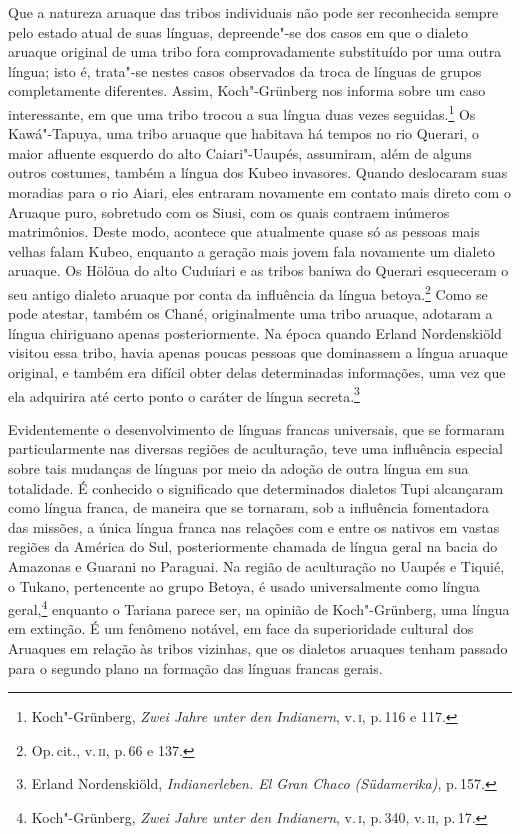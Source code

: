 Que a natureza aruaque das tribos individuais não pode ser reconhecida
sempre pelo estado atual de suas línguas, depreende"-se dos casos em que
o dialeto aruaque original de uma tribo fora comprovadamente substituído
por uma outra língua; isto é, trata"-se nestes casos observados da troca
de línguas de grupos completamente diferentes. Assim, Koch"-Grünberg nos
informa sobre um caso interessante, em que uma tribo trocou a sua língua
duas vezes seguidas.\footnote{Koch"-Grünberg, \textit{Zwei Jahre unter den
  Indianern}, v.\,\textsc{i}, p.\,116 e 117.} Os Kawá"-Tapuya, uma tribo aruaque que
habitava há tempos no rio Querari, o maior afluente esquerdo do alto
Caiari"-Uaupés, assumiram, além de alguns outros costumes, também a
língua dos Kubeo invasores. Quando deslocaram suas moradias para o rio
Aiari, eles entraram novamente em contato mais direto com o Aruaque
puro, sobretudo com os Siusi, com os quais contraem inúmeros
matrimônios. Deste modo, acontece que atualmente quase só as pessoas
mais velhas falam Kubeo, enquanto a geração mais jovem fala novamente um
dialeto aruaque. Os Hölöua do alto Cuduiari e as tribos baniwa do
Querari esqueceram o seu antigo dialeto aruaque por conta da influência
da língua betoya.\footnote{Op.\,cit., v.\,\textsc{ii}, p.\,66 e 137.} Como se pode
atestar, também os Chané, originalmente uma tribo aruaque, adotaram a
língua chiriguano apenas posteriormente. Na época quando Erland
Nordenskiöld visitou essa tribo, havia apenas poucas pessoas que
dominassem a língua aruaque original, e também era difícil obter delas
determinadas informações, uma vez que ela adquirira até
certo ponto o caráter de língua secreta.\footnote{Erland Nordenskiöld,
  \textit{Indianerleben. El Gran Chaco (Südamerika)}, p.\,157.}

Evidentemente o desenvolvimento de línguas francas universais, que se
formaram particularmente nas diversas regiões de aculturação, teve uma
influência especial sobre tais mudanças de línguas por meio da adoção
de outra língua em sua totalidade. É conhecido o significado que
determinados dialetos Tupi alcançaram como língua franca, de maneira que
se tornaram, sob a influência fomentadora das missões, a única língua
franca nas relações com e entre os nativos em vastas regiões da América
do Sul, posteriormente chamada de língua geral na bacia do Amazonas e
Guarani no Paraguai. Na região de aculturação no Uaupés e Tiquié, o
Tukano, pertencente ao grupo Betoya, é usado universalmente como língua
geral,\footnote{Koch"-Grünberg, \textit{Zwei Jahre unter den Indianern}, v.\,\textsc{i}, p.\,340, v.\,\textsc{ii}, p.\,17.} enquanto o Tariana parece ser, na opinião
de Koch"-Grünberg, uma língua em extinção. É um fenômeno notável, em face
da superioridade cultural dos Aruaques em relação às tribos vizinhas, que
os dialetos aruaques tenham passado para o segundo plano na formação
das línguas francas gerais.

